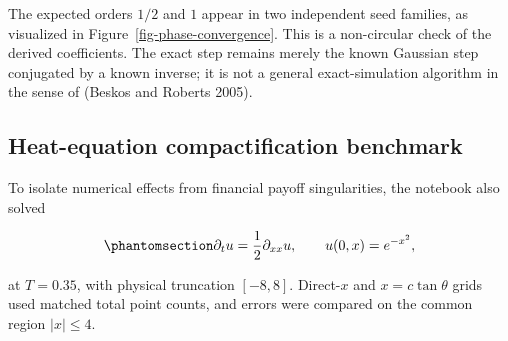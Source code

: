 \documentclass[
  english,
  10pt,
  letterpaper,
  DIV=11,
  numbers=noendperiod]{scrartcl}
\theoremstyle{definition}
\theoremstyle{plain}
\theoremstyle{plain}
\theoremstyle{remark}
\begin{document}
The expected orders \(1/2\) and \(1\) appear in two independent seed
families, as visualized in Figure~\ref{fig-phase-convergence}. This is a
non-circular check of the derived coefficients. The exact step remains
merely the known Gaussian step conjugated by a known inverse; it is not
a general exact-simulation algorithm in the sense of (Beskos and Roberts
2005).

\subsection{Heat-equation compactification
benchmark}\label{heat-equation-compactification-benchmark}

To isolate numerical effects from financial payoff singularities, the
notebook also solved

\begin{equation}\protect\phantomsection\label{eq-heat-benchmark}{
\partial_tu=\frac12\partial_{xx}u,
\qquad
u(0,x)=e^{-x^2},
}\end{equation}

at \(T=0.35\), with physical truncation \([-8,8]\). Direct-\(x\) and
\(x=c\tan\theta\) grids used matched total point counts, and errors were
compared on the common region \(|x|\le4\).
\end{document}
